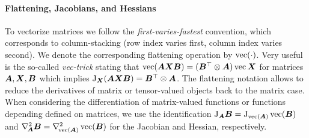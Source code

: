 \paragraph{Flattening, Jacobians, and Hessians}
To vectorize %
matrices %
we follow the %
\emph{first-varies-fastest} convention, which corresponds to column-stacking (row index varies first, column index varies second).
We denote the corresponding flattening operation by $\operatorname{vec}(\cdot)$.
Very useful is the so-called \emph{vec-trick} stating that $\operatorname{vec}({\bm{A}}{\bm{X}}{\bm{B}}) = ({\bm{B}}^\top\otimes {\bm{A}})\operatorname{vec}{{\bm{X}}}$
for matrices ${\bm{A}}, {\bm{X}}, {\bm{B}}$ %
which implies $\mathrm{J}_{\bm{X}}({\bm{A}}{\bm{X}}{\bm{B}}) = {\bm{B}}^\top\otimes {\bm{A}}$.
The flattening notation allows to reduce the derivatives of matrix or tensor-valued objects back to the matrix case.
When considering the differentiation of matrix-valued functions or functions depending defined on matrices, we use the identification $\mathrm{J}_{{\bm{A}}} {\bm{B}} = \mathrm{J}_{\operatorname{vec}( {\bm{A}} )}\operatorname{vec}({\bm{B}})$ and $\nabla_{\!{{\bm{A}}}}^{2}{\bm{B}} = \nabla_{\!{\operatorname{vec}({\bm{A}})}}^{2} \operatorname{vec}({\bm{B}})$ for the Jacobian and Hessian, respectively.

\begin{comment}
    Consider the Jacobian $\jac_{\va}\vb$ of a vector $\vb$ with respect to a vector $\va$, which collects all partial derivatives as $[\mJ_{\va}\vb]_{i,j} = \nicefrac{\partial [\vb]_i}{\partial [\va]_j}$.
For the Jacobian $\jac_{\mA}\mB$ of a matrix $\mB$ with respect to a matrix $\mA$, we simply set $\jac_{\mA} \mB = \jac_{\flatten( \mA )}\flatten(\mB)$.
Likewise, the Hessian $\gradsquared{\va}b$ of a scalar $b$ with respect to a vector $\va$ collects the second-order partial derivatives according to $[\gradsquared{\va}b]_{i,j} = \nicefrac{\partial^2 b}{\partial [\va]_i \partial [\va]_j}$.
For the Hessian $\gradsquared{\mA} b$ of a scalar $b$  with respect to \,a matrix $\mA$, we simply have $\gradsquared{\mA} b = \gradsquared{\flatten(\mA)}b$.
We also have $\grad{\mA} b = \grad{\flatten(\mA)} b$ for the gradient of a scalar w.r.t.\,a matrix.
\end{comment}

